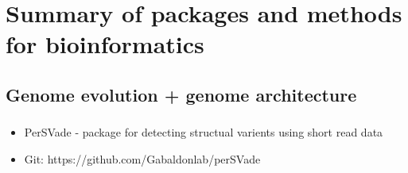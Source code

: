 \documentclass[document.tex]{subfiles}
\begin{document}
\chapter{Summary of packages and methods for bioinformatics}

\label{day:2023-02-15}
\section*{Genome evolution + genome architecture}

\subsection{}
\begin{itemize}
    \item PerSVade - package for detecting structual varients using short read data
    \item Git: https://github.com/Gabaldonlab/perSVade 
    \end{itemize}
    
    
\bib{}
\end{document}
